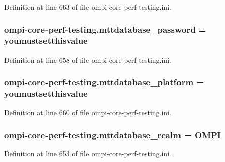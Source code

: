 Definition at line 663 of file ompi-\/core-\/perf-\/testing.\-ini.

\hypertarget{namespaceompi-core-perf-testing_ab011881d3842e51b012c8f7489179493}{
\subsubsection[{mttdatabase\-\_\-password}]{\setlength{\rightskip}{0pt plus 5cm}ompi-\/core-\/perf-\/testing.\-mttdatabase\-\_\-password = youmustsetthisvalue}}\label{namespaceompi-core-perf-testing_ab011881d3842e51b012c8f7489179493}


Definition at line 658 of file ompi-\/core-\/perf-\/testing.\-ini.

\hypertarget{namespaceompi-core-perf-testing_a7d4edb676b0208dbbcf806c3d99481ae}{
\subsubsection[{mttdatabase\-\_\-platform}]{\setlength{\rightskip}{0pt plus 5cm}ompi-\/core-\/perf-\/testing.\-mttdatabase\-\_\-platform = youmustsetthisvalue}}\label{namespaceompi-core-perf-testing_a7d4edb676b0208dbbcf806c3d99481ae}


Definition at line 660 of file ompi-\/core-\/perf-\/testing.\-ini.

\hypertarget{namespaceompi-core-perf-testing_a70d92258f538bfb8185dc65ef6661317}{
\subsubsection[{mttdatabase\-\_\-realm}]{\setlength{\rightskip}{0pt plus 5cm}ompi-\/core-\/perf-\/testing.\-mttdatabase\-\_\-realm = O\-M\-P\-I}}\label{namespaceompi-core-perf-testing_a70d92258f538bfb8185dc65ef6661317}


Definition at line 653 of file ompi-\/core-\/perf-\/testing.\-ini.

